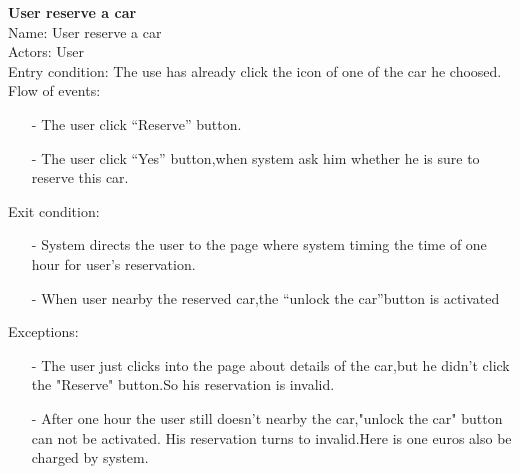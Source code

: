 \documentclass[12pt, letterpaper]{article}
\begin{document}
\textbf{User reserve a car} \\
Name: User reserve a car \\
Actors: User \\
Entry condition: The use has already click the icon of one of the car he choosed. \\
Flow of events: \\
\begin{itemize}
	\item[-] The user click “Reserve” button.
	\item[-] The user click “Yes” button,when system ask him whether he is sure to reserve this car.
\end{itemize}
Exit condition: \\
\begin{itemize}
	\item[-] System directs the user to the page where system timing the time of one hour for user’s
	reservation.
	\item[-] When user nearby the reserved car,the “unlock the car”button is activated
\end{itemize}
Exceptions: \\
\begin{itemize}
	\item[-] The user just clicks into the page about details of the car,but he didn’t click the
	"Reserve" button.So his reservation is invalid.
	\item[-] After one hour the user still doesn’t nearby the car,"unlock the car" button can not be
	activated. His reservation turns to invalid.Here is one euros also be charged by system.
\end{itemize} 
\vspace{0.5cm}
\end{document}
